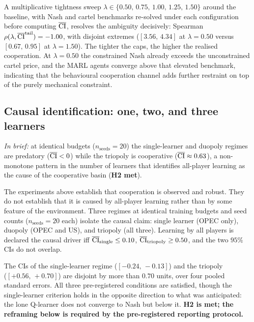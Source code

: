 A multiplicative tightness sweep
$\lambda \in \{0.50,\,0.75,\,1.00,\,1.25,\,1.50\}$ around
the baseline, with Nash and cartel benchmarks re-solved under
each configuration before computing $\overline{\mathrm{CI}}$, resolves the
ambiguity decisively: Spearman $\rho(\lambda,
\overline{\mathrm{CI}}^{\text{tail}}) = -1.00$, with disjoint extremes
($[3.56,\,4.34]$ at $\lambda = 0.50$ versus $[0.67,\,0.95]$
at $\lambda = 1.50$). The tighter the caps, the higher the
realised cooperation. At $\lambda = 0.50$ the constrained Nash
already exceeds the unconstrained cartel price, and the MARL
agents converge above that elevated benchmark, indicating that
the behavioural cooperation channel adds further restraint on
top of the purely mechanical constraint.

\subsection{Causal identification: one, two, and three learners}
\label{subsec:learners}

\emph{In brief:} at identical budgets ($n_{\text{seeds}} = 20$) the
single-learner and duopoly regimes are predatory ($\overline{\mathrm{CI}} < 0$)
while the triopoly is cooperative ($\overline{\mathrm{CI}} \approx 0.63$), a non-monotone
pattern in the number of learners that identifies all-player learning
as the cause of the cooperative basin (\textbf{H2 met}).

The experiments above establish that cooperation is observed and
robust. They do not establish that it is caused by
all-player learning rather than by some feature of the
environment. Three regimes at identical training budgets and
seed counts ($n_{\text{seeds}} = 20$ each) isolate the causal
claim: single learner (OPEC only), duopoly (OPEC and US), and
triopoly (all three). Learning by all players is declared the
causal driver iff $\overline{\mathrm{CI}}_{\text{single}} \leq 0.10$,
$\overline{\mathrm{CI}}_{\text{triopoly}} \geq 0.50$, and the two $95\%$ CIs do
not overlap.

\begin{verdict*}
The CIs of the single-learner regime ($[-0.24,\,-0.13]$) and the triopoly\\ ($[+0.56,\,+0.70]$) are disjoint by more than
$0.70$ units, over four pooled standard errors. All three
pre-registered conditions are satisfied, though the
single-learner criterion holds in the opposite direction
to what was anticipated: the lone Q-learner does not converge
to Nash but below it. \textbf{H2 is met; the reframing
below is required by the pre-registered reporting protocol.}
\end{verdict*}

